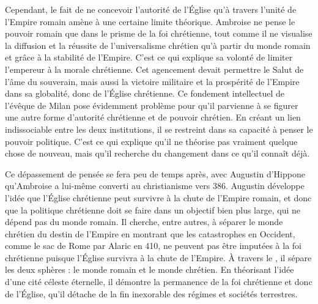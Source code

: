 \bigskip

Cependant, le fait de ne concevoir l'autorité de l'Église qu'à travers l'unité de l'Empire romain amène à une certaine limite théorique. Ambroise ne pense le pouvoir romain que dans le prisme de la foi chrétienne, tout comme il ne visualise la diffusion et la réussite de l'universalisme chrétien qu'à partir du monde romain et grâce à la stabilité de l'Empire. C'est ce qui explique sa volonté de limiter l'empereur à la morale chrétienne. Cet agencement devait permettre le Salut de l'âme du souverain, mais aussi la victoire militaire et la prospérité de l'Empire dans sa globalité, donc de l'Église chrétienne. Ce fondement intellectuel de l'évêque de Milan pose évidemment problème pour qu'il parvienne à se figurer une autre forme d'autorité chrétienne et de pouvoir chrétien. En créant un lien indissociable entre les deux institutions, il se restreint dans sa capacité à penser le pouvoir politique. C'est ce qui explique qu'il ne théorise pas vraiment quelque chose de nouveau, mais qu'il recherche du changement dans ce qu'il connaît déjà.

\bigskip

Ce dépassement de pensée se fera peu de temps après, avec Augustin d'Hippone qu'Ambroise a lui-même converti au christianisme vers 386. Augustin développe l'idée que l'Église chrétienne peut survivre à la chute de l'Empire romain, et donc que la politique chrétienne doit se faire dans un objectif bien plus large, qui ne dépend pas du monde romain. Il cherche, entre autres, à séparer le monde chrétien du destin de l'Empire en montrant que les catastrophes en Occident, comme le sac de Rome par Alaric en 410, ne peuvent pas être imputées à la foi chrétienne puisque l'Église survivra à la chute de l'Empire. À travers le , il sépare les deux sphères : le monde romain et le monde chrétien. En théorisant l'idée d'une cité céleste éternelle, il démontre la permanence de la foi chrétienne et donc de l'Église, qu'il détache de la fin inexorable des régimes et sociétés terrestres.
